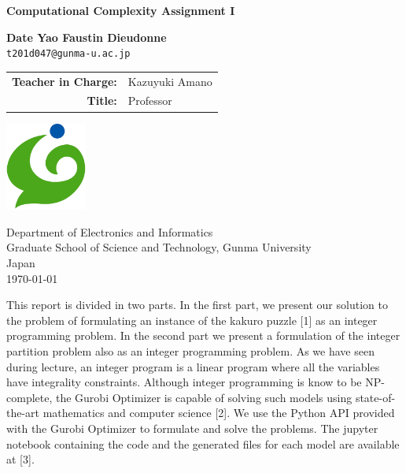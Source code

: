 \documentclass[11pt]{article}
\begin{document}
   

\begin{titlepage}
   \begin{center}
       \vspace*{1cm}

       \textbf{\Huge Computational Complexity Assignment I}

       \vspace{1.5cm}

       \textbf{\Large Date Yao Faustin Dieudonne}\\
	   \texttt{t201d047@gunma-u.ac.jp}

       \vspace{2cm}

       \begin{tabular}{r l}
           \textbf{Teacher in Charge:} & Kazuyuki Amano\\
           \textbf{Title:}      & Professor
       \end{tabular}

       \vspace{2cm}
            
	   \vfill 

       \includegraphics[width=0.2\textwidth]{images/university}
            
       Department of Electronics and Informatics\\
       Graduate School of Science and Technology, Gunma University\\
       Japan\\
       \today
            
   \end{center}
\end{titlepage} 


    
This report is divided in two parts. In the first part, we present our
solution to the problem of formulating an instance of the kakuro puzzle
{[}1{]} as an integer programming problem. In the second part we present
a formulation of the integer partition problem also as an integer
programming problem. As we have seen during lecture, an integer program
is a linear program where all the variables have integrality
constraints. Although integer programming is know to be NP-complete, the
Gurobi Optimizer is capable of solving such models using
state-of-the-art mathematics and computer science {[}2{]}. We use the
Python API provided with the Gurobi Optimizer to formulate and solve the
problems. The jupyter notebook containing the code and the generated files for each model are available at {[}3{]}.
\end{document}

